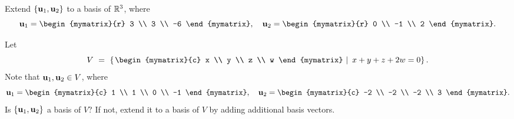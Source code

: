 \begin{ex}
  Extend $\left\{\mbox{\bf u}_1,\mbox{\bf u}_2\right\}$ to a basis of $\mathbb{R}^3$, where
  \begin{equation*}
    \vect{u}_1 = \begin{mymatrix}{r} 3 \\ 3 \\ -6 \end{mymatrix},\quad
    \vect{u}_2 = \begin{mymatrix}{r} 0 \\ -1 \\ 2 \end{mymatrix}.
  \end{equation*}
\end{ex}

\begin{ex}
  Let
  \begin{equation*}
    V ~=~ \set{\left.
        \begin{mymatrix}{c} x \\ y \\ z \\ w \end{mymatrix}
        ~\right\vert~
      x+y+z+2w = 0
    }.
  \end{equation*}
  Note that $\mbox{\bf u}_1,\mbox{\bf u}_2\in V$, where
  \begin{equation*}
    \vect{u}_1 = \begin{mymatrix}{c} 1 \\ 1 \\ 0 \\ -1 \end{mymatrix},\quad
    \vect{u}_2 = \begin{mymatrix}{c} -2 \\ -2 \\ -2 \\ 3 \end{mymatrix}.
  \end{equation*}
  Is $\left\{\mbox{\bf u}_1,\mbox{\bf u}_2\right\}$ a basis of $V$? If not, extend it
  to a basis of $V$ by adding additional basis vectors.
\end{ex}


